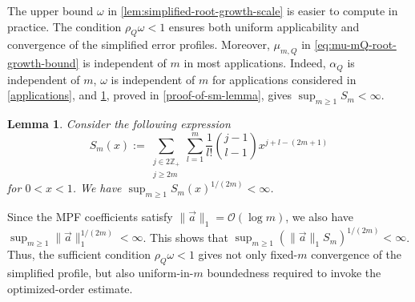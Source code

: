 \documentclass[10pt,reqno]{article}
\numberwithin{equation}{section}
\theoremstyle{plain}
\newtheorem{lem}[thm]{Lemma}
\theoremstyle{definition}
\begin{document}
The upper bound \(\omega\) in \cref{lem:simplified-root-growth-scale} is easier to compute in practice. The condition \(\rho_Q\omega<1\) ensures both uniform applicability and convergence of the simplified error profiles. Moreover, \(\mu_{m,Q}\) in \cref{eq:mu-mQ-root-growth-bound} is independent of \(m\) in most applications. Indeed, \(\alpha_Q\) is independent of \(m\), \(\omega\) is independent of \(m\) for applications considered in \cref{applications}, and \cref{sm-lemma}, proved in \cref{proof-of-sm-lemma}, gives \(\sup_{m\geq1} S_m<\infty\).

\begin{lem}\label{sm-lemma}
Consider the following expression
\begin{equation}\label{eq:simplified-profile-Sm-def}
S_m(x) := \sum_{\substack{j\in2\mathbb Z_+\\ j\geq 2m}} \sum_{l=1}^{m} \frac{1}{l!} \binom{j-1}{l-1} x^{j+l-(2m+1)}
\end{equation}
for $0 < x < 1$.  We have $\sup_{m\geq1}S_m(x)^{1/(2m)}<\infty$.   
\end{lem}

Since the MPF coefficients satisfy \(\|\vec a\|_1=\mathcal O(\log m)\), we also have $\sup_{m\geq1}\|\vec a\|_1^{1/(2m)}<\infty$. This shows that \(\sup_{m \geq 1} (\|\vec a\|_1 S_m)^{1/(2m)} < \infty\). Thus, the sufficient condition \(\rho_Q\omega<1\) gives not only fixed-\(m\) convergence of the simplified profile, but also uniform-in-\(m\) boundedness required to invoke the optimized-order estimate.
\end{document}
